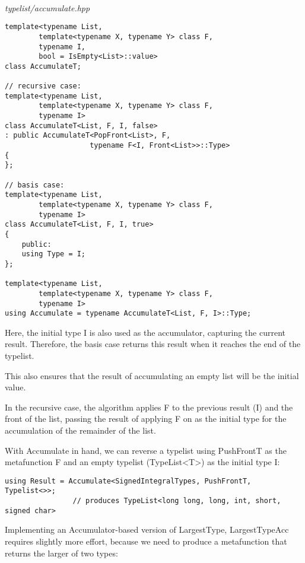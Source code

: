 \hspace*{\fill} \\ %
\noindent
\textit{typelist/accumulate.hpp}
\begin{lstlisting}[style=styleCXX]
template<typename List,
		template<typename X, typename Y> class F,
		typename I,
		bool = IsEmpty<List>::value>
class AccumulateT;

// recursive case:
template<typename List,
		template<typename X, typename Y> class F,
		typename I>
class AccumulateT<List, F, I, false>
: public AccumulateT<PopFront<List>, F,
					typename F<I, Front<List>>::Type>
{
};

// basis case:
template<typename List,
		template<typename X, typename Y> class F,
		typename I>
class AccumulateT<List, F, I, true>
{
	public:
	using Type = I;
};

template<typename List,
		template<typename X, typename Y> class F,
		typename I>
using Accumulate = typename AccumulateT<List, F, I>::Type;
\end{lstlisting}

Here, the initial type I is also used as the accumulator, capturing the current result. Therefore, the basis case returns this result when it reaches the end of the typelist.

\begin{tcolorbox}[colback=webgreen!5!white,colframe=webgreen!75!black]
\hspace*{0.75cm}This also ensures that the result of accumulating an empty list will be the initial value.
\end{tcolorbox}

In the recursive case, the algorithm applies F to the previous result (I) and the front of the list, passing the result of applying F on as the initial type for the accumulation of the remainder of the list.

With Accumulate in hand, we can reverse a typelist using PushFrontT as the metafunction F and an empty typelist (TypeList<T>) as the initial type I:

\begin{lstlisting}[style=styleCXX]
using Result = Accumulate<SignedIntegralTypes, PushFrontT, Typelist<>>;
				// produces TypeList<long long, long, int, short, signed char>
\end{lstlisting}

Implementing an Accumulator-based version of LargestType, LargestTypeAcc requires slightly more effort, because we need to produce a metafunction that returns the larger of two types:

